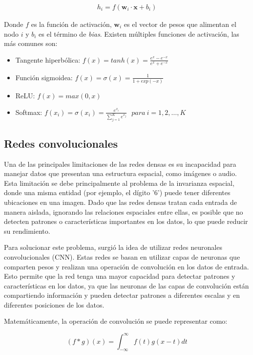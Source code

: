 \begin{align}
    h_i = f(\mathbf{w}_i \cdot \mathbf{x} + b_i)
\end{align}

Donde $f$ es la función de activación, $\mathbf{w}_i$ es el vector de pesos que alimentan el nodo $i$ y $b_i$ es el
término de {\it bias}. Existen múltiples funciones de activación, las más comunes son:

\begin{itemize}
    \item Tangente hiperbólica: $f(x) = tanh(x) = \frac{e^x - e^{-x}}{e^x + e^{-x}}$
    \item Función sigmoidea: $f(x) = \sigma(x) = \frac{1}{1+exp(-x)}$
    \item ReLU: $f(x) = max(0, x)$
    \item Softmax: $f(x_i) = \sigma(x_i) = \frac{e^{x_{i}}}{\sum_{j=1}^K e^{x_{j}}} \ \ \ para\ i=1,2,\dots,K$
\end{itemize}

\subsection{Redes convolucionales}
Una de las principales limitaciones de las redes densas es su incapacidad para manejar datos que presentan una
estructura espacial, como imágenes o audio. Esta limitación se debe principalmente al problema de la invarianza
espacial, donde una misma entidad (por ejemplo, el dígito '6') puede tener diferentes ubicaciones en una imagen. Dado
que las redes densas tratan cada entrada de manera aislada, ignorando las relaciones espaciales entre ellas, es posible
que no detecten patrones o características importantes en los datos, lo que puede reducir su rendimiento.

Para solucionar este problema, surgió la idea de utilizar redes neuronales convolucionales (CNN). Estas redes se basan
en utilizar capas de neuronas que comparten pesos y realizan una operación de convolución en los datos de entrada. Esto
permite que la red tenga una mayor capacidad para detectar patrones y características en los datos, ya que las neuronas
de las capas de convolución están compartiendo información y pueden detectar patrones a diferentes escalas y en
diferentes posiciones de los datos.

Matemáticamente, la operación de convolución se puede representar como:

\begin{equation}
    (f * g)(x) = \int_{-\infty}^{\infty} f(t)g(x-t) dt
    \label{eq:convolucion}
\end{equation}


